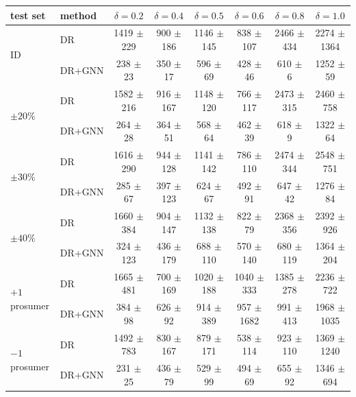 
\begin{tabular}{llcccccc}
\toprule
test set & method & $\delta=0.2$ & $\delta=0.4$ & $\delta=0.5$ & $\delta=0.6$ & $\delta=0.8$ & $\delta=1.0$ \\
\midrule
\multirow{2}{*}{ID} & DR & 1419 $\pm$ 229 & 900 $\pm$ 186 & 1146 $\pm$ 145 & 838 $\pm$ 107 & 2466 $\pm$ 434 & 2274 $\pm$ 1364 \\
 & DR+GNN & 238 $\pm$ 23 & 350 $\pm$ 17 & 596 $\pm$ 69 & 428 $\pm$ 46 & 610 $\pm$ 6 & 1252 $\pm$ 59 \\
\midrule
\multirow{2}{*}{$\pm20\%$} & DR & 1582 $\pm$ 216 & 916 $\pm$ 167 & 1148 $\pm$ 120 & 766 $\pm$ 117 & 2473 $\pm$ 315 & 2460 $\pm$ 758 \\
 & DR+GNN & 264 $\pm$ 28 & 364 $\pm$ 51 & 568 $\pm$ 64 & 462 $\pm$ 39 & 618 $\pm$ 9 & 1322 $\pm$ 64 \\
\midrule
\multirow{2}{*}{$\pm30\%$} & DR & 1616 $\pm$ 290 & 944 $\pm$ 128 & 1141 $\pm$ 142 & 786 $\pm$ 110 & 2474 $\pm$ 344 & 2548 $\pm$ 751 \\
 & DR+GNN & 285 $\pm$ 67 & 397 $\pm$ 123 & 624 $\pm$ 67 & 492 $\pm$ 91 & 647 $\pm$ 42 & 1276 $\pm$ 84 \\
\midrule
\multirow{2}{*}{$\pm40\%$} & DR & 1660 $\pm$ 384 & 904 $\pm$ 147 & 1132 $\pm$ 138 & 822 $\pm$ 79 & 2368 $\pm$ 356 & 2392 $\pm$ 926 \\
 & DR+GNN & 324 $\pm$ 123 & 436 $\pm$ 179 & 688 $\pm$ 110 & 570 $\pm$ 140 & 680 $\pm$ 119 & 1364 $\pm$ 204 \\
\midrule
\multirow{2}{*}{$+1$ prosumer} & DR & 1665 $\pm$ 481 & 700 $\pm$ 169 & 1020 $\pm$ 188 & 1040 $\pm$ 333 & 1385 $\pm$ 278 & 2236 $\pm$ 722 \\
 & DR+GNN & 384 $\pm$ 98 & 626 $\pm$ 92 & 914 $\pm$ 389 & 957 $\pm$ 1682 & 991 $\pm$ 413 & 1968 $\pm$ 1035 \\
\midrule
\multirow{2}{*}{$-1$ prosumer} & DR & 1492 $\pm$ 783 & 830 $\pm$ 167 & 879 $\pm$ 171 & 538 $\pm$ 114 & 923 $\pm$ 110 & 1369 $\pm$ 1240 \\
 & DR+GNN & 231 $\pm$ 25 & 436 $\pm$ 79 & 529 $\pm$ 99 & 494 $\pm$ 69 & 655 $\pm$ 92 & 1346 $\pm$ 694 \\
\bottomrule
\end{tabular}
